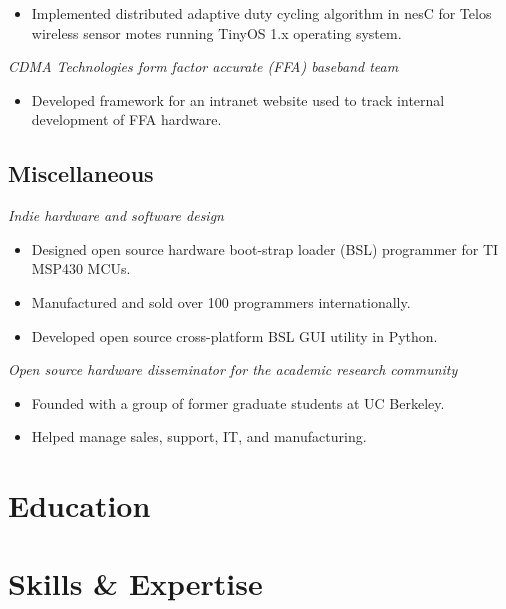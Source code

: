 \documentclass[11pt,a4paper]{moderncv}
\begin{document}
{
  \begin{itemize}
    \item Implemented distributed adaptive duty cycling algorithm in nesC for Telos wireless sensor motes running TinyOS 1.x operating system.
  \end{itemize}
}
{
  \textit{CDMA Technologies form factor accurate (FFA) baseband team}
  \begin{itemize}
    \item Developed framework for an intranet website used to track internal development of FFA hardware.
  \end{itemize}
}
\subsection{Miscellaneous}
{
  \textit{Indie hardware and software design}
  \begin{itemize}
    \item Designed open source hardware boot-strap loader (BSL) programmer for TI MSP430 MCUs.
    \item Manufactured and sold over 100 programmers internationally.
    \item Developed open source cross-platform BSL GUI utility in Python.
  \end{itemize}
}
{
  \textit{Open source hardware disseminator for the academic research community}
  \begin{itemize}
    \item Founded with a group of former graduate students at UC Berkeley.
    \item Helped manage sales, support, IT, and manufacturing.
  \end{itemize}
}

\section{Education}

\section{Skills \& Expertise}
\end{document}
